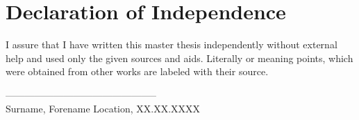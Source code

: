 \section*{Declaration of Independence}%
I assure that I have written this master thesis independently without external help and used only the given sources and aids. Literally or meaning points, which were obtained from other works are labeled with their source.
\vspace{1cm}%
\begin{flushleft}%
-----------------------------------------------\\%
Surname, Forename%
\hfill%
Location, XX.XX.XXXX%
\end{flushleft}%

